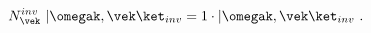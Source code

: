\begin{equation}
  N^{inv}_{\vek}~|\omegak ,\vek\ket_{inv} = 1\cdot |\omegak
  ,\vek\ket_{inv} \ .
\end{equation}

